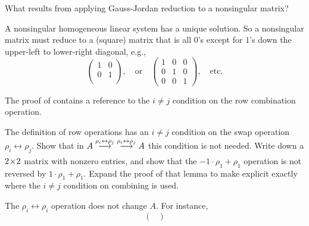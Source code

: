 \begin{exercises}
\begin{answer}
\begin{exparts}
      \end{exparts}  
    \end{answer}
  \recommended \item  
    What results from applying Gauss-Jordan reduction to a
    nonsingular matrix?
    \begin{answer}
      A nonsingular homogeneous linear system has a unique solution.
      So a nonsingular matrix must reduce to a (square) 
      matrix that is all \( 0 \)'s
      except for \( 1 \)'s down the upper-left to lower-right diagonal, e.g.,
      \begin{equation*}
         \begin{pmatrix}
           1  &0  \\
           0  &1  \\
         \end{pmatrix},
         \quad\text{or}\quad
         \begin{pmatrix}
           1  &0  &0  \\
           0  &1  &0  \\
           0  &0  &1
         \end{pmatrix},
         \quad\text{etc.}
      \end{equation*}  
    \end{answer}
 \item \label{exer:INotJMakesRowOpsRev}
   The proof of  contains a reference to the 
   $i\neq j$ condition on the row combination operation.
   \begin{exparts}
     \partsitem The definition of row operations has an $i\neq j$ condition on
        the swap operation $\rho_i\leftrightarrow\rho_j$. 
        Show that in 
        $A\mathrel{ \mathop{\longrightarrow}\limits^{\rho_i\leftrightarrow\rho_j\mathstrut}_{ \begin{subarray}{l} \relax \end{subarray}}}\;
          \mathrel{ \mathop{\longrightarrow}\limits^{\rho_i\leftrightarrow\rho_j\mathstrut}_{ \begin{subarray}{l} \relax \end{subarray}}}A$
        this condition is not needed.
     \partsitem Write down a $2 \! \times \! 2$ matrix with nonzero entries,
        and show that the $-1\cdot\rho_1+\rho_1$ operation is not
        reversed by $1\cdot\rho_1+\rho_1$.
     \partsitem Expand the proof of that lemma to make explicit exactly where 
        the $i\neq j$ condition on combining is used.
   \end{exparts}
   \begin{answer}
    \begin{exparts}
      \partsitem The $\rho_i\leftrightarrow\rho_i$ operation does not
        change $A$.
      \partsitem For instance,
        \begin{equation*}
          \begin{pmatrix}

\end{pmatrix}
\end{equation*}
\end{exparts}
\end{answer}
\end{exercises}
